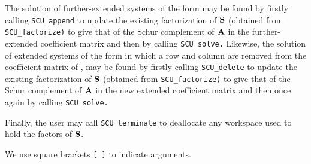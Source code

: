 \documentclass{galahad}
\newcommand{\packagename}{SCU}
\begin{document}
The solution of further-extended systems of the form 
may be found by firstly calling {\tt \packagename\_append} to update the 
existing factorization of ${\mathbf{S}}$ 
(obtained from {\tt \packagename\_factorize)} to give that of 
the Schur complement of $ {\mathbf{A}}$ 
in the further-extended coefficient matrix and then by calling 
{\tt \packagename\_solve.} 
Likewise, the solution of extended systems of the form 
in which a row and column are removed from the 
coefficient matrix of , 
may be found by firstly calling {\tt \packagename\_delete} to update the 
existing factorization of ${\mathbf{S}}$ 
(obtained from {\tt \packagename\_factorize)} to give that of 
the Schur complement of $ {\mathbf{A}}$ 
in the new extended coefficient matrix and then once again by calling 
{\tt \packagename\_solve.} 

Finally, the user may call {\tt \packagename\_terminate} 
to deallocate any workspace used to hold the factors of ${\mathbf{S}}$. 

We use square brackets {\tt [ ]} to indicate \optional arguments.






 
\end{document}
